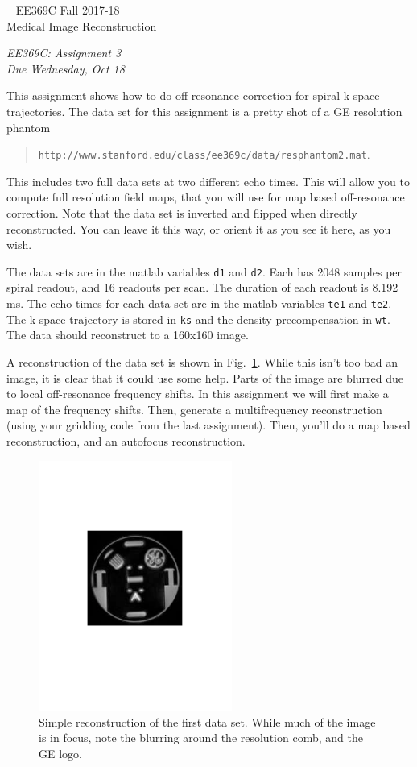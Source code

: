 \documentclass[11pt]{article}
\def\hdr {{\parindent 0pt  \vskip -0.7in%
EE369C  Fall 2017-18 \hfill \\
Medical Image Reconstruction \hfill  \\
\vskip 0.1in }}
\begin{document}
\
\hdr


\begin{center}
{\Large\em EE369C:  Assignment 3} \\[0.15in]
{\em Due Wednesday, Oct 18}
\end{center}

This assignment shows how to do off-resonance correction for spiral k-space trajectories. 
The data set for this assignment is a pretty shot of a GE resolution phantom
\begin{quote}
 {\tt http://www.stanford.edu/class/ee369c/data/resphantom2.mat}. 
\end{quote}
This includes two full data sets at two different echo times.  This will allow you to compute full resolution field maps, that you will use for map based off-resonance correction.  Note that the data set is inverted and flipped when directly reconstructed.  You can leave it this way, or orient it as you see it here, as you wish.

The data sets are in the matlab variables \verb+d1+ and \verb+d2+.  Each has 2048 samples per spiral readout, and 16 readouts per scan.  The duration of each readout is 8.192 ms.  The echo times for each data set are in the matlab variables \verb+te1+ and \verb+te2+. The k-space trajectory is stored in \verb+ks+ and the density precompensation in \verb+wt+.  The data should reconstruct to a 160x160 image. 

A reconstruction of the data set is shown in Fig.~\ref{im1}.  While this isn't too bad an image, it is clear that it could use some help. Parts of the image are blurred due to local off-resonance frequency shifts.  In this assignment we will first make a map of the frequency shifts.  Then, generate a multifrequency reconstruction (using your gridding code from the last assignment).  Then, you'll do a map based reconstruction, and an autofocus reconstruction.  

\begin{figure}[bh]
  \begin{center}
  \includegraphics[width=2.5in]{im1w0.pdf}
  \end{center}
  \caption[]{Simple reconstruction of the first data set. While much of the image is in focus, note the blurring around the resolution comb, and the GE logo.}
  \label{im1}
\end{figure}
\end{document}
